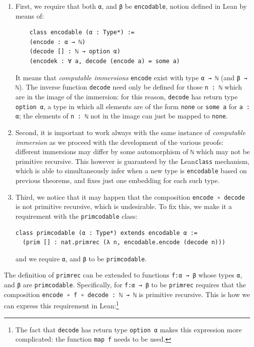 \documentclass[preprint]{elsarticle}
\theoremstyle{remark}
\newcommand{\LEAN}{\textsf{Lean}\xspace}
\begin{document}
\begin{enumerate}
\item
First, we require that both \lstinline|α|, and \lstinline|β| be \lstinline|encodable|, notion defined in \LEAN by means of:

\begin{lstlisting}
    class encodable (α : Type*) :=
    (encode : α → ℕ)
    (decode [] : ℕ → option α)
    (encodek : ∀ a, decode (encode a) = some a)
\end{lstlisting}
It means that \emph{computable immersions} \lstinline|encode| exist with type \lstinline|α → ℕ| (and \lstinline|β → ℕ|). The inverse function \lstinline|decode| need only be defined for those \lstinline|n : ℕ| which are in the image of the immersion: for this reason, \lstinline|decode| has return type \lstinline|option α|, a type in which all elements are of the form \lstinline|none| or \lstinline|some a| for \lstinline|a : α|; the elements of \lstinline|n : ℕ| not in the image can just be mapped to \lstinline|none|.

\item
Second, it is important to work always with the same instance of \emph{computable immersion} as we proceed with the development of the various proofs: different immersions may differ by some automorphism of \lstinline|ℕ| which may not be primitive recursive. This however is guaranteed by the \LEAN \lstinline|class| mechanism, which is able to simultaneously infer when a new type is \lstinline|encodable| based on previous theorems, and fixes just one embedding for each such type.

\item
Third, we notice that it may happen that the composition \lstinline|encode ∘ decode| is not primitive recursive, which is undesirable.
To fix this, we make it a requirement with the \lstinline|primcodable| class:

\begin{lstlisting}
class primcodable (α : Type*) extends encodable α :=
  (prim [] : nat.primrec (λ n, encodable.encode (decode n)))
\end{lstlisting}
\noindent
and we require \lstinline|α|, and \lstinline|β| to be \lstinline|primcodable|.
\end{enumerate}

The definition of \lstinline|primrec| can be extended to functions \lstinline|f:α → β| whose types \lstinline|α|, and \lstinline|β| are \lstinline|primcodable|. Specifically, for \lstinline|f:α → β| to be \lstinline|primrec| requires that the composition \lstinline|encode ∘ f ∘ decode : ℕ → ℕ| is primitive recursive. This is how we can express this requirement in \LEAN:\footnote{The fact that \lstinline|decode| has return type \lstinline|option α| makes this expression more complicated: the function \lstinline|map f| needs to be used.}
\end{document}
